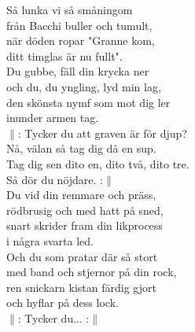 \documentclass[a6paper, 10pt, twoside]{article}
\begin{document}
\noindent
{}
\small
\vspace{-5pt}
\begin{center}
\end{center}
\begin{lyrics}
Så lunka vi så småningom\\ 
från Bacchi buller och tumult,\\ 
när döden ropar "Granne kom,\\ 
ditt timglas är nu fullt". \\
Du gubbe, fäll din krycka ner\\ 
och du, du yngling, lyd min lag,\\ 
den skönsta nymf som mot dig ler\\ 
inunder armen tag.
\vspace{5pt}\\
$\|$: Tycker du att graven är för djup?\\ 
Nå, välan så tag dig då en sup.\\ 
Tag dig sen dito en, dito två, dito tre.\\ 
Så dör du nöjdare. :$\|$
\vspace{5pt}\\
Du vid din remmare och präss,\\
rödbrusig och med hatt på sned,\\ 
snart skrider fram din likprocess\\ 
i några svarta led.\\ 
Och du som pratar där så stort\\ 
med band och stjernor på din rock,\\ 
ren snickarn kistan färdig gjort\\ 
och hyflar på dess lock.
\vspace{5pt}\\
$\|$: Tycker du... :$\|$


\end{lyrics}
\end{document}
